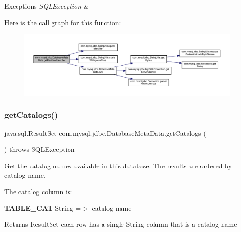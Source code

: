 \begin{DoxyExceptions}{Exceptions}
{\em S\+Q\+L\+Exception} & \\
\hline
\end{DoxyExceptions}
Here is the call graph for this function\+:\nopagebreak
\begin{figure}[H]
\begin{center}
\leavevmode
\includegraphics[width=350pt]{classcom_1_1mysql_1_1jdbc_1_1_database_meta_data_aa8a8a2f7924aa411eebaae653e1f3802_cgraph}
\end{center}
\end{figure}
\mbox{\label{classcom_1_1mysql_1_1jdbc_1_1_database_meta_data_aead6a147747c6041b3dc03399b30bd9c}} 
\subsubsection{\texorpdfstring{get\+Catalogs()}{getCatalogs()}}
{\footnotesize\ttfamily java.\+sql.\+Result\+Set com.\+mysql.\+jdbc.\+Database\+Meta\+Data.\+get\+Catalogs (\begin{DoxyParamCaption}{ }\end{DoxyParamCaption}) throws S\+Q\+L\+Exception}

Get the catalog names available in this database. The results are ordered by catalog name. 

The catalog column is\+: 
\begin{DoxyEnumerate}
\item {\bfseries T\+A\+B\+L\+E\+\_\+\+C\+AT} String =$>$ catalog name 
\end{DoxyEnumerate}

\begin{DoxyReturn}{Returns}
Result\+Set each row has a single String column that is a catalog name 
\end{DoxyReturn}

